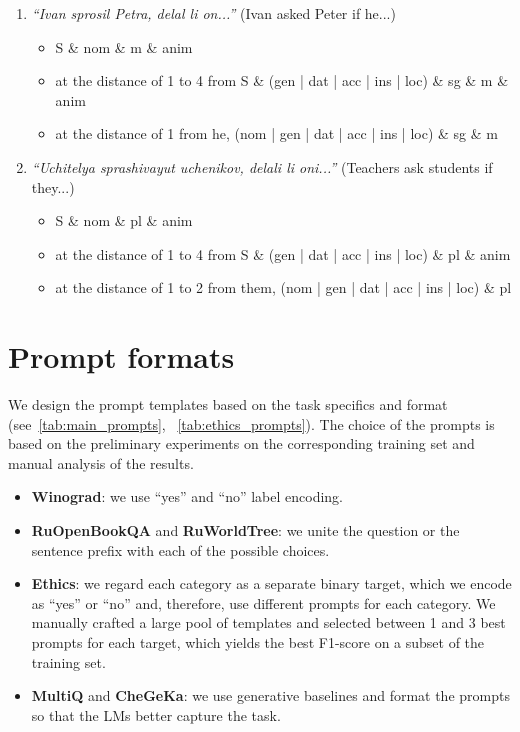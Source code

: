 \documentclass[11pt]{article}
\begin{document}
\begin{itemize}[leftmargin=1em,noitemsep,topsep=0.1pt]
\begin{enumerate}[leftmargin=0.5em,noitemsep,topsep=0.1pt]
        \item \textit{``Ivan sprosil Petra, delal li on...''} (Ivan asked Peter if he...)
        
        \begin{itemize}[noitemsep,topsep=0.1pt]
            \item S \& nom \& m \& anim
            \item at the distance of 1 to 4 from S \& (gen | dat | acc | ins | loc) \& sg \& m \& anim
            \item at the distance of 1 from he, (nom | gen | dat | acc | ins | loc) \& sg \& m
        \end{itemize}
        
        
        \item \textit{``Uchitelya sprashivayut uchenikov, delali li oni...''} (Teachers ask students if they...)
        
        \begin{itemize}[noitemsep,topsep=0.1pt]
            \item S \& nom \& pl \& anim 
            \item at the distance of 1 to 4 from S \& (gen | dat | acc | ins | loc) \& pl \& anim
            \item at the distance of 1 to 2 from them, (nom | gen | dat | acc | ins | loc) \& pl
        \end{itemize}
    \end{enumerate}
\end{itemize}
 

\vfill\eject
\section{Prompt formats}
\label{app:prompt_formats}

We design the prompt templates based on the task specifics and format (see~\autoref{tab:main_prompts}, ~\autoref{tab:ethics_prompts}). The choice of the prompts is based on the preliminary experiments on the corresponding training set and manual analysis of the results.
\begin{itemize}[leftmargin=1em,noitemsep,topsep=0.1pt]
    \item \textbf{Winograd}: we use ``yes'' and ``no'' label encoding.
    \item \textbf{RuOpenBookQA} and \textbf{RuWorldTree}: we unite the question or the sentence prefix with each of the possible choices.
    \item \textbf{Ethics}: we regard each category as a separate binary target, which we encode as ``yes'' or ``no'' and, therefore, use different prompts for each category. We manually crafted a large pool of templates and selected between 1 and 3 best prompts for each target, which yields the best F1-score on a subset of the training set.
    \item \textbf{MultiQ} and \textbf{CheGeKa}: we use generative baselines and format the prompts so that the LMs better capture the task.
\end{itemize}
\end{document}
